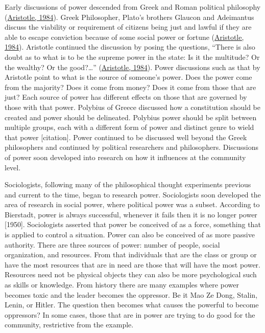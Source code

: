 \documentclass[
  donotrepeattitle,doc, 12pt, a4paper,floatsintext]{apa7}
\begin{document}
Early discussions of power descended from Greek and Roman political philosophy (\protect\hyperlink{ref-aristotle1984}{Aristotle, 1984}). Greek Philosopher, Plato's brothers Glaucon and Adeimantus discuss the viability or requirement of citizens being just and lawful if they are able to escape conviction because of some social power or fortune (\protect\hyperlink{ref-aristotle1984}{Aristotle, 1984}). Aristotle continued the discussion by posing the questions, ``There is also doubt as to what is to be the supreme power in the state: Is it the multitude? Or the wealthy? Or the good?\ldots{}'' (\protect\hyperlink{ref-aristotle1984}{Aristotle, 1984}). Power discussions such as that by Aristotle point to what is the source of someone's power. Does the power come from the majority? Does it come from money? Does it come from those that are just? Each source of power has different effects on those that are governed by those with that power. Polybius of Greece discussed how a constitution should be created and power should be delineated. Polybius power should be split between multiple groups, each with a different form of power and distinct genre to wield that power {[}citation{]}. Power continued to be discussed well beyond the Greek philosophers and continued by political researchers and philosophers. Discussions of power soon developed into research on how it influences at the community level.

Sociologists, following many of the philosophical thought experiments previous and current to the time, began to research power. Sociologists soon developed the area of research in social power, where political power was a subset. According to Bierstadt, power is always successful, whenever it fails then it is no longer power {[}1950{]}. Sociologists asserted that power be conceived of as a force, something that is applied to control a situation. Power can also be conceived of as more passive authority. There are three sources of power: number of people, social organization, and resources. From that individuals that are the class or group or have the most resources that are in need are those that will have the most power. Resources need not be physical objects they can also be more psychological such as skills or knowledge. From history there are many examples where power becomes toxic and the leader becomes the oppressor. Be it Mao Ze Dong, Stalin, Lenin, or Hitler. The question then becomes what causes the powerful to become oppressors? In some cases, those that are in power are trying to do good for the community, restrictive from the example.
\end{document}

